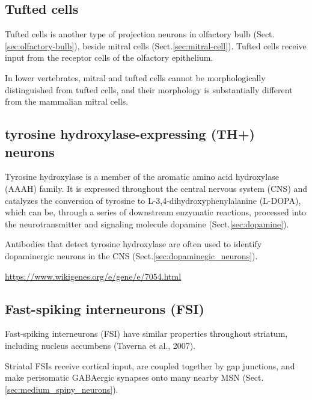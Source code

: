 \subsection{Tufted cells}
\label{sec:tufted-cell}


Tufted cells is another type of projection neurons in olfactory bulb
(Sect.\ref{sec:olfactory-bulb}), beside mitral cells
(Sect.\ref{sec:mitral-cell}). Tufted cells receive input from the receptor cells
of the olfactory epithelium.

In lower vertebrates, mitral and tufted cells
cannot be morphologically distinguished from tufted cells, and their morphology
is substantially different from the mammalian mitral cells.



\subsection{tyrosine hydroxylase-expressing (TH+) neurons}
\label{sec:tyrosine-hydroxylase-expressing-neurons}
\label{sec:tyrosine-hydroxylase}

Tyrosine hydroxylase is a member of the aromatic amino acid hydroxylase (AAAH)
family.  It is expressed throughout the central nervous system (CNS) and
catalyzes the conversion of tyrosine to L-3,4-dihydroxyphenylalanine (L-DOPA),
which can be, through a series of downstream enzymatic reactions, processed into
the neurotransmitter and signaling molecule dopamine (Sect.\ref{sec:dopamine}).

Antibodies that detect tyrosine hydroxylase are often used to identify
dopaminergic neurons in the CNS (Sect.\ref{sec:dopaminegic_neurons}).


\url{https://www.wikigenes.org/e/gene/e/7054.html}

\subsection{Fast-spiking interneurons (FSI)}
\label{sec:fast-spiking-interneuron}

Fast-spiking interneurons (FSI) have similar properties throughout striatum,
including nucleus accumbens (Taverna et al., 2007).

Striatal FSIs receive cortical input, are coupled together by gap junctions, and
make perisomatic GABAergic synapses onto many nearby MSN
(Sect.\ref{sec:medium_spiny_neurons}). \citep{berke2011}

